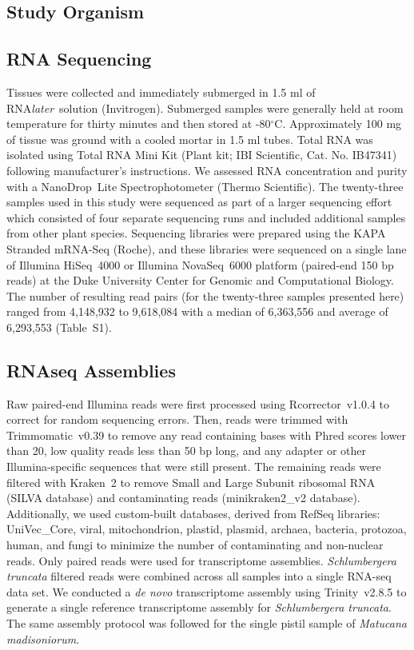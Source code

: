\documentclass[11pt,letterpaper,titlepage]{article}
\begin{document}
\begin{linenumbers}
\subsection*{Study Organism}

\subsection*{RNA Sequencing}

Tissues were collected and immediately submerged in 1.5 ml of RNA\textit{later}\texttrademark~solution (Invitrogen).
Submerged samples were generally held at room temperature for thirty minutes and then stored at -80$^{\circ}$C.
Approximately 100 mg of tissue was ground with a cooled mortar in 1.5 ml tubes.
Total RNA was isolated using Total RNA Mini Kit (Plant kit; IBI Scientific, Cat. No. IB47341) following manufacturer's instructions.
We assessed RNA concentration and purity with a NanoDrop\texttrademark~Lite Spectrophotometer (Thermo Scientific).
The twenty-three samples used in this study were sequenced as part of a larger sequencing effort which consisted of four separate sequencing runs and included additional samples from other plant species.
Sequencing libraries were prepared using the KAPA Stranded mRNA-Seq (Roche), and these libraries were sequenced on a single lane of Illumina \mbox{HiSeq}~4000 or Illumina \mbox{NovaSeq}~6000 platform (paired-end 150 bp reads) at the Duke University Center for Genomic and Computational Biology.
The number of resulting read pairs (for the twenty-three samples presented here) ranged from 4,148,932 to 9,618,084 with a median of 6,363,556 and average of 6,293,553 (Table~S1).

\subsection*{RNAseq Assemblies}

Raw paired-end Illumina reads were first processed using \mbox{Rcorrector}~v1.0.4 \cite{song2015} to correct for random sequencing errors.
Then, reads were trimmed with \mbox{Trimmomatic}~v0.39 \cite{bolger2014} to remove any read containing bases with Phred scores lower than 20, low quality reads less than 50 bp long, and any adapter or other Illumina-specific sequences that were still present.
The remaining reads were filtered with \mbox{Kraken}~2 \cite{wood2019} to remove Small and Large Subunit ribosomal RNA (SILVA database) \cite{quast2013} and contaminating reads (minikraken2\_v2 database).
Additionally, we used custom-built databases, derived from RefSeq libraries: UniVec\_Core, viral, mitochondrion, plastid, plasmid, archaea, bacteria, protozoa, human, and fungi to minimize the number of contaminating and non-nuclear reads.
Only paired reads were used for transcriptome assemblies.
\textit{Schlumbergera truncata} filtered reads were combined across all samples into a single RNA-seq data set.
We conducted a \textit{de novo} transcriptome assembly using \mbox{Trinity}~v2.8.5 \cite{grabherr2011} to generate a single reference transcriptome assembly for \textit{Schlumbergera truncata}.
The same assembly protocol was followed for the single pistil sample of \textit{Matucana madisoniorum}.


\end{linenumbers}
\end{document}
